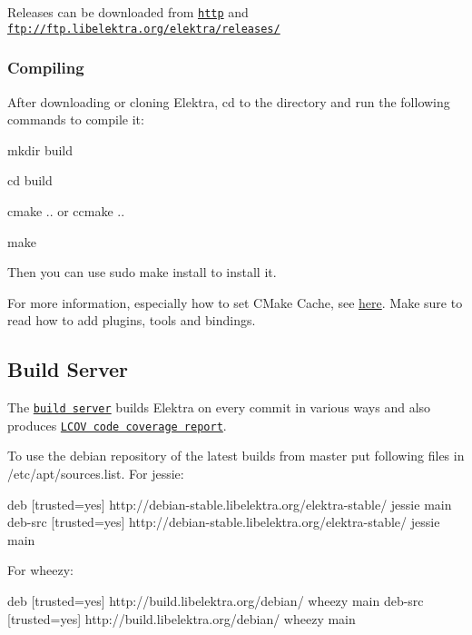 Releases can be downloaded from \href{http://www.libelektra.org/ftp/elektra/releases/}{\tt http} and {\ttfamily \href{ftp://ftp.libelektra.org/elektra/releases/}{\tt ftp\+://ftp.\+libelektra.\+org/elektra/releases/}}

\subsubsection*{Compiling}

After downloading or cloning Elektra, {\ttfamily cd} to the directory and run the following commands to compile it\+:


\begin{DoxyItemize}
\item {\ttfamily mkdir build}
\item {\ttfamily cd build}
\item {\ttfamily cmake ..} or {\ttfamily ccmake ..}
\item {\ttfamily make}
\end{DoxyItemize}

Then you can use {\ttfamily sudo make install} to install it.

For more information, especially how to set C\+Make Cache, see \hyperlink{doc_COMPILE_md}{here}. Make sure to read how to add plugins, tools and bindings.

\subsection*{Build Server}

The \href{http://build.libelektra.org:8080/}{\tt build server} builds Elektra on every commit in various ways and also produces \href{http://doc.libelektra.org/coverage/latest}{\tt L\+C\+O\+V code coverage report}.

To use the debian repository of the latest builds from master put following files in /etc/apt/sources.list. For jessie\+: \begin{DoxyVerb}    deb     [trusted=yes] http://debian-stable.libelektra.org/elektra-stable/ jessie main
    deb-src [trusted=yes] http://debian-stable.libelektra.org/elektra-stable/ jessie main
\end{DoxyVerb}


For wheezy\+: \begin{DoxyVerb}     deb     [trusted=yes] http://build.libelektra.org/debian/ wheezy main
     deb-src [trusted=yes] http://build.libelektra.org/debian/ wheezy main
\end{DoxyVerb}


